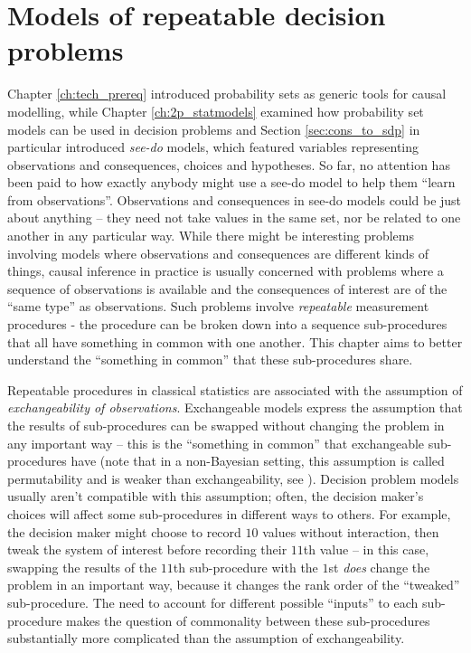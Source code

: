 
\chapter[Repeatable decision problems]{Models of repeatable decision problems}\label{ch:evaluating_decisions}

Chapter \ref{ch:tech_prereq} introduced probability sets as generic tools for causal modelling, while Chapter \ref{ch:2p_statmodels} examined how probability set models can be used in decision problems and Section \ref{sec:cons_to_sdp} in particular introduced \emph{see-do} models, which featured variables representing observations and consequences, choices and hypotheses. So far, no attention has been paid to how exactly anybody might use a see-do model to help them ``learn from observations''. Observations and consequences in see-do models could be just about anything -- they need not take values in the same set, nor be related to one another in any particular way. While there might be interesting problems involving models where observations and consequences are different kinds of things, causal inference in practice is usually concerned with problems where a sequence of observations is available and the consequences of interest are of the ``same type'' as observations. Such problems involve \emph{repeatable} measurement procedures - the procedure can be broken down into a sequence sub-procedures that all have something in common with one another. This chapter aims to better understand the ``something in common'' that these sub-procedures share.

Repeatable procedures in classical statistics are associated with the assumption of \emph{exchangeability of observations}. Exchangeable models express the assumption that the results of sub-procedures can be swapped without changing the problem in any important way -- this is the ``something in common'' that exchangeable sub-procedures have (note that in a non-Bayesian setting, this assumption is called permutability and is weaker than exchangeability, see \citet[pg. 463]{walley_statistical_1991}). Decision problem models usually aren't compatible with this assumption; often, the decision maker's choices will affect some sub-procedures in different ways to others. For example, the decision maker might choose to record $10$ values without interaction, then tweak the system of interest before recording their $11$th value -- in this case, swapping the results of the $11$th sub-procedure with the $1$st \emph{does} change the problem in an important way, because it changes the rank order of the ``tweaked'' sub-procedure. The need to account for different possible ``inputs'' to each sub-procedure makes the question of commonality between these sub-procedures substantially more complicated than the assumption of exchangeability.


